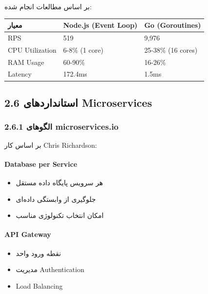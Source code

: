 \documentclass[
]{article}
\newcounter{none} %
\providecommand{\tightlist}{%
  \setlength{\itemsep}{0pt}\setlength{\parskip}{0pt}}
\begin{document}
بر اساس مطالعات انجام شده:

{\def\LTcaptype{none} %
\begin{longtable}[]{@{}lll@{}}
\toprule\noalign{}
معیار & Node.js (Event Loop) & Go (Goroutines) \\
\midrule\noalign{}
\endhead
\bottomrule\noalign{}
\endlastfoot
RPS & 519 & 9,976 \\
CPU Utilization & 6-8\% (1 core) & 25-38\% (16 cores) \\
RAM Usage & 60-90\% & 16-26\% \\
Latency & 172.4ms & 1.5ms \\
\end{longtable}
}

\subsection{2.6 استانداردهای
Microservices}\label{ux627ux633ux62aux627ux646ux62fux627ux631ux62fux647ux627ux6cc-microservices}

\subsubsection{2.6.1 الگوهای
microservices.io}\label{ux627ux644ux6afux648ux647ux627ux6cc-microservices.io}

بر اساس کار Chris Richardson:

\paragraph{Database per Service}\label{database-per-service}

\begin{itemize}
\tightlist
\item
  هر سرویس پایگاه داده مستقل
\item
  جلوگیری از وابستگی داده‌ای
\item
  امکان انتخاب تکنولوژی مناسب
\end{itemize}

\paragraph{API Gateway}\label{api-gateway}

\begin{itemize}
\tightlist
\item
  نقطه ورود واحد
\item
  مدیریت Authentication
\item
  Load Balancing
\end{itemize}
\end{document}
